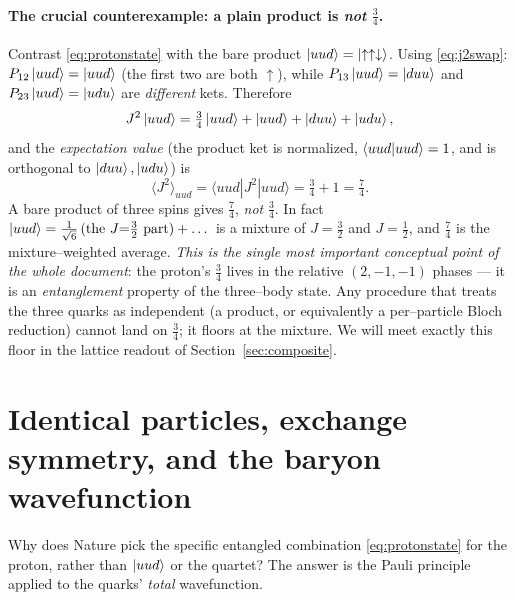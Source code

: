 \documentclass[11pt,oneside]{article}
\newcommand{\expval}[1]{\langle #1 \rangle}
\newcommand{\mel}[3]{\langle #1 | #2 | #3 \rangle}
\newcommand{\up}{\uparrow}
\newcommand{\down}{\downarrow}
\begin{document}
\paragraph{The crucial counterexample: a plain product is \emph{not} $\tfrac34$.}
Contrast \eqref{eq:protonstate} with the bare product $\ket{uud}=\ket{\up\up\down}$.
Using \eqref{eq:j2swap}: $P_{12}\ket{uud}=\ket{uud}$ (the first two are both
$\up$), while $P_{13}\ket{uud}=\ket{duu}$ and $P_{23}\ket{uud}=\ket{udu}$ are
\emph{different} kets. Therefore
\begin{equation}
  J^2\ket{uud} = \tfrac34\ket{uud} + \ket{uud} + \ket{duu} + \ket{udu},
\end{equation}
and the \emph{expectation value} (the product ket is normalized,
$\braket{uud|uud}=1$, and is orthogonal to $\ket{duu},\ket{udu}$) is
\begin{equation}
  \boxed{\,\expval{J^2}_{uud} = \mel{uud}{J^2}{uud} = \tfrac34 + 1 = \tfrac74.\,}
  \label{eq:product74}
\end{equation}
A bare product of three spins gives $\tfrac74$, \emph{not} $\tfrac34$. In fact
$\ket{uud} = \tfrac{1}{\sqrt6}\,(\text{the }J{=}\tfrac32\text{ part}) + \dots$
is a mixture of $J=\tfrac32$ and $J=\tfrac12$, and $\tfrac74$ is the
mixture--weighted average. \emph{This is the single most important conceptual
point of the whole document}: the proton's $\tfrac34$ lives in the relative
$(2,-1,-1)$ phases --- it is an \emph{entanglement} property of the three--body
state. Any procedure that treats the three quarks as independent (a product, or
equivalently a per--particle Bloch reduction) cannot land on $\tfrac34$; it
floors at the mixture. We will meet exactly this floor in the lattice readout of
Section~\ref{sec:composite}.

\section{Identical particles, exchange symmetry, and the baryon wavefunction}
\label{sec:identical}

Why does Nature pick the specific entangled combination \eqref{eq:protonstate}
for the proton, rather than $\ket{uud}$ or the quartet? The answer is the Pauli
principle applied to the quarks' \emph{total} wavefunction.
\end{document}
